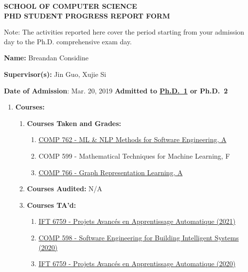 \documentclass[11pt]{article}
\begin{document}
    \begin{center}
        \large {\bf SCHOOL OF COMPUTER SCIENCE \\ PHD STUDENT PROGRESS REPORT FORM}
    \end{center}

    Note: The activities reported here cover the period starting
    from your admission day to the Ph.D. comprehensive exam day.
    \medskip

    \textbf{Name:} Breandan Considine

    \textbf{Supervisor(s):} Jin Guo, Xujie Si

    \textbf{Date of Admission}: Mar. 20, 2019
    \hspace{45mm}
    \textbf{Admitted to \underline{Ph.D.\ 1} or Ph.D.\ 2}

    \begin{enumerate}
        \item \textbf{Courses:}
        \begin{enumerate}
            \item \textbf{Courses Taken and Grades:}

            \begin{enumerate}
                \item \href{https://www.cs.mcgill.ca/~cs762/}{COMP 762 - ML \& NLP Methods for Software Engineering, A}
                \item COMP 599 - Mathematical Techniques for Machine Learning, F
                \item \href{https://cs.mcgill.ca/~wlh/comp766/}{COMP 766 - Graph Representation Learning, A}
            \end{enumerate}

            \item \textbf{Courses Audited:} N/A

            \item \textbf{Courses TA'd:}

            \begin{enumerate}
                \item \href{https://admission.umontreal.ca/cours-et-horaires/cours/IFT-6759/}{IFT 6759 - Projets Avanc\'es en Apprentissage Automatique (2021)}
                \item \href{https://github.com/jin-guo/COMP598_Fall2020}{COMP 598 - Software Engineering for Building Intelligent Systems (2020)}
                \item \href{https://admission.umontreal.ca/cours-et-horaires/cours/IFT-6759/}{IFT 6759 - Projets Avanc\'es en Apprentissage Automatique (2020)}
            \end{enumerate}


\end{enumerate}
\end{enumerate}
\end{document}
